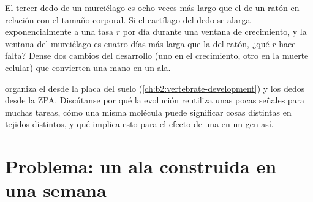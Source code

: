 \begin{exercise}[$\star\star\star$]\label{exo:b2:limb-organogenesis:11}
El tercer dedo de un murciélago es ocho veces más largo que el de un ratón
en relación con el tamaño corporal. Si el cartílago del dedo se alarga
exponencialmente a una tasa $r$ por día durante una ventana de
crecimiento, y la ventana del murciélago es cuatro días más larga que la
del ratón, ¿qué $r$ hace falta? Dense dos cambios del desarrollo (uno en
el crecimiento, otro en la muerte celular) que convierten una mano en un
ala.
\end{exercise}

\begin{exercise}[$\star\star\star$]\label{exo:b2:limb-organogenesis:12}
 organiza el  desde la placa del suelo
(\cref{ch:b2:vertebrate-development}) y los dedos desde la ZPA.
Discútanse por qué la evolución reutiliza unas pocas señales para muchas
tareas, cómo una misma molécula puede significar cosas distintas en
tejidos distintos, y qué implica esto para el efecto de una  en
un gen así.
\end{exercise}

\section{Problema: un ala construida en una semana}

